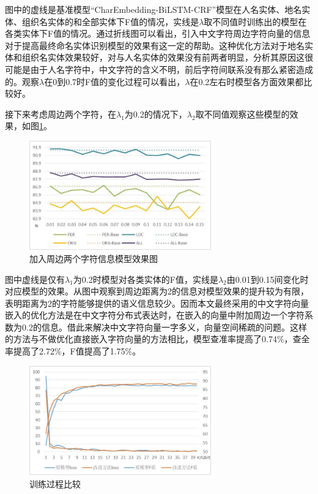 \documentclass[winfonts,master,oneside,nobackinfo]{njuthesis}
\begin{document}
图中的虚线是基准模型“CharEmbedding-BiLSTM-CRF”模型在人名实体、地名实体、组织名实体的和全部实体下F值的情况，实线是$\lambda$取不同值时训练出的模型在各类实体下F值的情况。通过折线图可以看出，引入中文字符周边字符向量的信息对于提高最终命名实体识别模型的效果有这一定的帮助。这种优化方法对于地名实体和组织名实体效果较好，对与人名实体的效果没有前两者明显，分析其原因这很可能是由于人名字符中，中文字符的含义不明，前后字符间联系没有那么紧密造成的。观察$\lambda$在0到0.7时F值的变化过程可以看出，$\lambda$在0.2左右时模型各方面效果都比较好。

接下来考虑周边两个字符，在$\lambda_{1}$为0.2的情况下，$\lambda_{2}$取不同值观察这些模型的效果，如图\ref{k=2}。

\begin{figure}[h]
\centering
\includegraphics[width=0.7\textwidth]{./figure/参数2.jpg}
\caption{加入周边两个字符信息模型效果图}
\label{k=2}
\end{figure}

图中虚线是仅有$\lambda_{1}$为0.2时模型对各类实体的F值，实线是$\lambda_{2}$由0.01到0.15间变化时对应模型的效果。从图中观察到周边距离为2的信息对模型效果的提升较为有限，表明距离为2的字符能够提供的语义信息较少。因而本文最终采用的中文字符向量嵌入的优化方法是在中文字符分布式表达时，在嵌入的向量中附加周边一个字符系数为0.2的信息。借此来解决中文字符向量一字多义，向量空间稀疏的问题。这样的方法与不做优化直接嵌入字符向量的方法相比，模型查准率提高了0.74\%，查全率提高了2.72\%，F值提高了1.75\%。

\begin{figure}[H]
\centering
\includegraphics[width=0.7\textwidth]{./figure/训练过程.jpg}
\caption{训练过程比较}
\label{train_step}
\end{figure}
\end{document}
